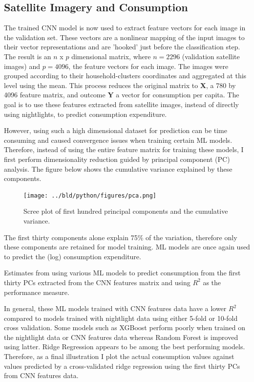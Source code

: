 \documentclass[11pt, a4paper, leqno]{article}
\begin{document}
\subsection{Satellite Imagery and Consumption}

 The trained CNN model is now used to extract feature vectors for each image in the validation set. These vectors are a nonlinear mapping of the input images to their vector representations and are 'hooked' just before the classification step. The result is an $n$ x $p$ dimensional matrix, where $n = 2296$ (validation satellite images) and $p = 4096$, the feature vectors for each image. The images were grouped according to their household-clusters coordinates and aggregated at this level using the mean. This process reduces the original matrix to $\textbf{X}$, a 780 by 4096 feature matrix, and outcome $\textbf{Y}$ a vector for consumption per capita. The goal is to use these features extracted from satellite images, instead of directly using nightlights, to predict consumption expenditure.

 However, using such a high dimensional dataset for prediction can be time consuming and caused convergence issues when training certain ML models. Therefore, instead of using the entire feature matrix for training these models, I first perform dimensionality reduction guided by principal component (PC) analysis. The figure below shows the cumulative variance explained by these components. 

\begin{figure}[H]
\centering
    \texttt{[image: ../bld/python/figures/pca.png]}
    \caption{Scree plot of first hundred principal components and the cumulative variance.}
    \label{fig:python-predictions}
\end{figure}

 The first thirty components alone explain 75\% of the variation, therefore only these components are retained for model training. ML models are once again used to predict the (log) consumption expenditure.

\begin{table}[H]
\centering
    \scalebox{1.1}{}
	\caption{Estimates from using various ML models to predict consumption from the first thirty PCs extracted from the CNN features matrix and using $R^2$ as the performance measure.}
\end{table}

In general, these ML models trained with CNN features data have a lower $R^2$  compared to models trained with nightlight data using either 5-fold or 10-fold cross validation. Some models such as XGBoost perform poorly when trained on the nightlight data or CNN features data whereas Random Forest is improved using latter. Ridge Regression appears to be among the best performing models. Therefore, as a final illustration I plot the actual consumption values against values predicted by a cross-validated ridge regression using the first thirty PCs from CNN features data.
\end{document}
